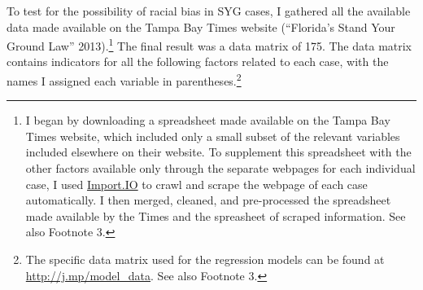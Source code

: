 \documentclass[12pt,article]{article}
\begin{document}
To test for the possibility of racial bias in SYG cases, I gathered all
the available data made available on the Tampa Bay Times website
(``Florida's Stand Your Ground Law'' 2013).\footnote{I began by
  downloading a spreadsheet made available on the Tampa Bay Times
  website, which included only a small subset of the relevant variables
  included elsewhere on their website. To supplement this spreadsheet
  with the other factors available only through the separate webpages
  for each individual case, I used \href{http://import.io}{Import.IO} to
  crawl and scrape the webpage of each case automatically. I then
  merged, cleaned, and pre-processed the spreadsheet made available by
  the Times and the spreasheet of scraped information. See also Footnote
  3.} The final result was a data matrix of 175. The data matrix
contains indicators for all the following factors related to each case,
with the names I assigned each variable in parentheses.\footnote{The
  specific data matrix used for the regression models can be found at
  \href{http://j.mp/model_data}{\url{http://j.mp/model_data}}. See also
  Footnote 3.}
\end{document}

